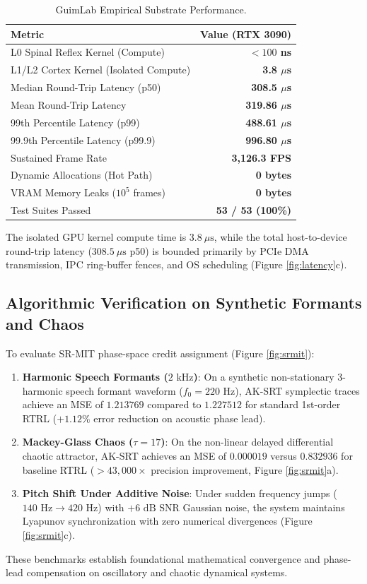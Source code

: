 \documentclass[10pt,twocolumn,letterpaper]{article}
\begin{document}
\begin{table}[h]
\centering
\small
\begin{tabular}{lr}
\toprule
\textbf{Metric} & \textbf{Value (RTX 3090)} \\
\midrule
L0 Spinal Reflex Kernel (Compute) & \textbf{$< 100$ ns} \\
L1/L2 Cortex Kernel (Isolated Compute) & \textbf{3.8 $\mu$s} \\
Median Round-Trip Latency (p50) & \textbf{308.5 $\mu$s} \\
Mean Round-Trip Latency & \textbf{319.86 $\mu$s} \\
99th Percentile Latency (p99) & \textbf{488.61 $\mu$s} \\
99.9th Percentile Latency (p99.9) & \textbf{996.80 $\mu$s} \\
Sustained Frame Rate & \textbf{3,126.3 FPS} \\
Dynamic Allocations (Hot Path) & \textbf{0 bytes} \\
VRAM Memory Leaks ($10^5$ frames) & \textbf{0 bytes} \\
Test Suites Passed & \textbf{53 / 53 (100\%)} \\
\bottomrule
\end{tabular}
\caption{GuimLab Empirical Substrate Performance.}
\label{tab:bench}
\end{table}

The isolated GPU kernel compute time is $3.8\ \mu\text{s}$, while the total host-to-device round-trip latency ($308.5\ \mu\text{s}$ p50) is bounded primarily by PCIe DMA transmission, IPC ring-buffer fences, and OS scheduling (Figure \ref{fig:latency}c).

\subsection{Algorithmic Verification on Synthetic Formants and Chaos}
To evaluate SR-MIT phase-space credit assignment (Figure \ref{fig:srmit}):
\begin{enumerate}
  \item \textbf{Harmonic Speech Formants ($2\text{ kHz}$)}: On a synthetic non-stationary 3-harmonic speech formant waveform ($f_0 = 220\text{ Hz}$), AK-SRT symplectic traces achieve an MSE of $1.213769$ compared to $1.227512$ for standard 1st-order RTRL ($+1.12\%$ error reduction on acoustic phase lead).
  \item \textbf{Mackey-Glass Chaos ($\tau=17$)}: On the non-linear delayed differential chaotic attractor, AK-SRT achieves an MSE of $0.000019$ versus $0.832936$ for baseline RTRL ($> 43,000\times$ precision improvement, Figure \ref{fig:srmit}a).
  \item \textbf{Pitch Shift Under Additive Noise}: Under sudden frequency jumps ($140\text{ Hz} \to 420\text{ Hz}$) with $+6\text{ dB}$ SNR Gaussian noise, the system maintains Lyapunov synchronization with zero numerical divergences (Figure \ref{fig:srmit}c).
\end{enumerate}
These benchmarks establish foundational mathematical convergence and phase-lead compensation on oscillatory and chaotic dynamical systems.
\end{document}
